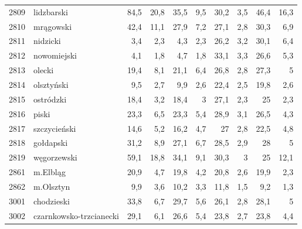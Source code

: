 \begin{center}
\begin{longtable}{lp{3cm}rrrrrrrr}
2809 & lidzbarski              & 84,5    & 20,8        & 35,5     & 9,5          & 30,2     & 3,5          & 46,4     & 16,3         \\
2810 & mrągowski               & 42,4    & 11,1        & 27,9     & 7,2          & 27,1     & 2,8          & 30,3     & 6,9          \\
2811 & nidzicki                & 3,4     & 2,3         & 4,3      & 2,3          & 26,2     & 3,2          & 30,1     & 6,4          \\
2812 & nowomiejski             & 4,1     & 1,8         & 4,7      & 1,8          & 33,1     & 3,3          & 26,6     & 5,3          \\
2813 & olecki                  & 19,4    & 8,1         & 21,1     & 6,4          & 26,8     & 2,8          & 27,3     & 5            \\
2814 & olsztyński              & 9,5     & 2,7         & 9,9      & 2,6          & 22,4     & 2,5          & 19,8     & 2,6          \\
2815 & ostródzki               & 18,4    & 3,2         & 18,4     & 3            & 27,1     & 2,3          & 25       & 2,3          \\
2816 & piski                   & 23,3    & 6,5         & 23,3     & 5,4          & 28,9     & 3,1          & 26,5     & 4,3          \\
2817 & szczycieński            & 14,6    & 5,2         & 16,2     & 4,7          & 27       & 2,8          & 22,5     & 4,8          \\
2818 & gołdapski               & 31,2    & 8,9         & 27,1     & 6,7          & 28,5     & 2,9          & 28       & 5            \\
2819 & węgorzewski             & 59,1    & 18,8        & 34,1     & 9,1          & 30,3     & 3            & 25       & 12,1         \\
2861 & m.Elbląg                & 20,9    & 4,7         & 19,8     & 4,2          & 20,8     & 2,6          & 19,9     & 2,3          \\
2862 & m.Olsztyn               & 9,9     & 3,6         & 10,2     & 3,3          & 11,8     & 1,5          & 9,2      & 1,3          \\
3001 & chodzieski              & 33,8    & 6,7         & 29,7     & 5,6          & 26,1     & 2,8          & 28,1     & 5            \\
3002 & czarnkowsko-trzcianecki & 29,1    & 6,1         & 26,6     & 5,4          & 23,8     & 2,7          & 23,8     & 4,4          \\

\end{longtable}
\end{center}
